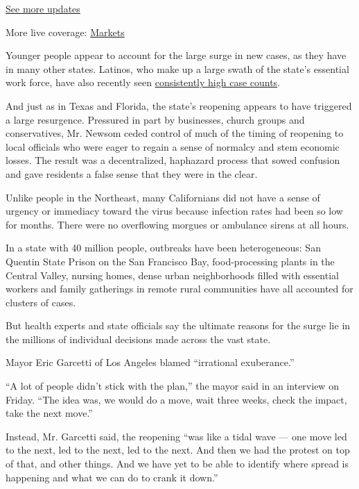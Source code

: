 \href{https://www.nytimes.com/2020/08/04/world/coronavirus-cases.html?action=click\&pgtype=Article\&state=default\&region=MAIN_CONTENT_1\&context=storylines_live_updates}{See
more updates}

More live coverage:
\href{https://www.nytimes.com/live/2020/08/04/business/stock-market-today-coronavirus?action=click\&pgtype=Article\&state=default\&region=MAIN_CONTENT_1\&context=storylines_live_updates}{Markets}

Younger people appear to account for the large surge in new cases, as
they have in many other states. Latinos, who make up a large swath of
the state's essential work force, have also recently seen
\href{https://www.nytimes.com/2020/06/26/us/corona-virus-latinos.html}{consistently
high case counts}.

And just as in Texas and Florida, the state's reopening appears to have
triggered a large resurgence. Pressured in part by businesses, church
groups and conservatives, Mr. Newsom ceded control of much of the timing
of reopening to local officials who were eager to regain a sense of
normalcy and stem economic losses. The result was a decentralized,
haphazard process that sowed confusion and gave residents a false sense
that they were in the clear.

Unlike people in the Northeast, many Californians did not have a sense
of urgency or immediacy toward the virus because infection rates had
been so low for months. There were no overflowing morgues or ambulance
sirens at all hours.

In a state with 40 million people, outbreaks have been heterogeneous:
San Quentin State Prison on the San Francisco Bay, food-processing
plants in the Central Valley, nursing homes, dense urban neighborhoods
filled with essential workers and family gatherings in remote rural
communities have all accounted for clusters of cases.

But health experts and state officials say the ultimate reasons for the
surge lie in the millions of individual decisions made across the vast
state.

Mayor Eric Garcetti of Los Angeles blamed ``irrational exuberance.''

``A lot of people didn't stick with the plan,'' the mayor said in an
interview on Friday. ``The idea was, we would do a move, wait three
weeks, check the impact, take the next move.''

Instead, Mr. Garcetti said, the reopening ``was like a tidal wave ---
one move led to the next, led to the next, led to the next. And then we
had the protest on top of that, and other things. And we have yet to be
able to identify where spread is happening and what we can do to crank
it down.''

